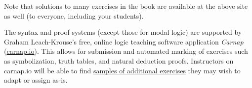 Note that solutions to many exercises in the book are available at the above site as well (to everyone, including your students).

The syntax and proof systems (except those for modal logic) are supported by Graham Leach-Krouse's free, online logic teaching software application \textit{Carnap} (\href{https://carnap.io}{carnap.io}). This allows for submission and automated marking of exercises such as symbolization, truth tables, and natural deduction proofs.  Instructors on carnap.io will be able to find \href{https://carnap.io/shared/rzach@ucalgary.ca/forall%20x:%20Calgary.md}{samples of additional exercises} they may wish to adapt or assign as-is.